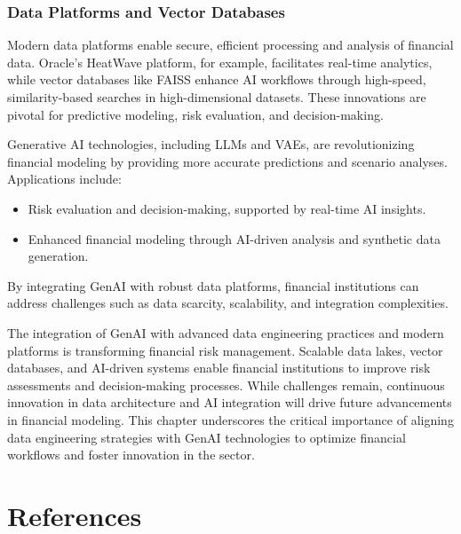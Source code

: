 \documentclass[a4paper,12pt]{scrbook}
\begin{document}
	\subsection{Data Platforms and Vector Databases}
	Modern data platforms enable secure, efficient processing and analysis of financial data. Oracle's HeatWave platform, for example, facilitates real-time analytics, while vector databases like FAISS enhance AI workflows through high-speed, similarity-based searches in high-dimensional datasets. These innovations are pivotal for predictive modeling, risk evaluation, and decision-making.
	
	Generative AI technologies, including LLMs and VAEs, are revolutionizing financial modeling by providing more accurate predictions and scenario analyses. Applications include:
	\begin{itemize}
		\item Risk evaluation and decision-making, supported by real-time AI insights.
		\item Enhanced financial modeling through AI-driven analysis and synthetic data generation.
	\end{itemize}
	By integrating GenAI with robust data platforms, financial institutions can address challenges such as data scarcity, scalability, and integration complexities.
	
	The integration of GenAI with advanced data engineering practices and modern platforms is transforming financial risk management. Scalable data lakes, vector databases, and AI-driven systems enable financial institutions to improve risk assessments and decision-making processes. While challenges remain, continuous innovation in data architecture and AI integration will drive future advancements in financial modeling. This chapter underscores the critical importance of aligning data engineering strategies with GenAI technologies to optimize financial workflows and foster innovation in the sector.
	
	
	
	\chapter*{References}
	
\end{document}
